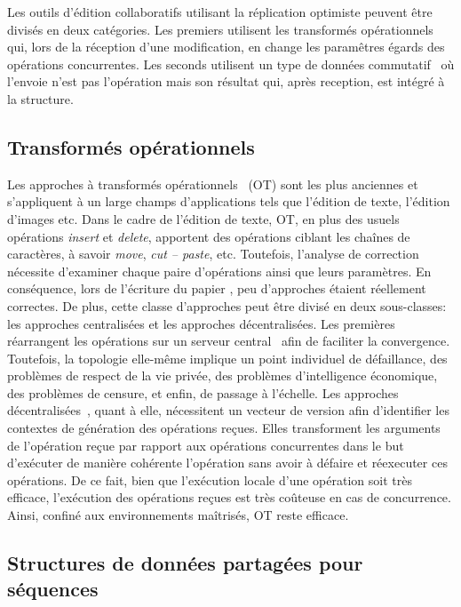 Les outils d'édition collaboratifs utilisant la réplication optimiste peuvent
être divisés en deux catégories. Les premiers utilisent les transformés
opérationnels~\cite{sun2009contextbased, sun1998operational} qui, lors de la
réception d'une modification, en change les paramêtres égards des opérations
concurrentes. Les seconds utilisent un type de données
commutatif~\cite{shapiro2011comprehensive, shapiro2011conflict} où l'envoie
n'est pas l'opération mais son résultat qui, après reception, est intégré à la
structure. 

\subsection{Transformés opérationnels}

Les approches à transformés opérationnels~\cite{sun2009contextbased,
  sun1998operational} (OT) sont les plus anciennes et s'appliquent à un large
champs d'applications tels que l'édition de texte, l'édition d'images etc. Dans
le cadre de l'édition de texte, OT, en plus des usuels opérations \emph{insert}
et \emph{delete}, apportent des opérations ciblant les chaînes de caractères, à
savoir \emph{move}, \emph{cut -- paste}, etc. Toutefois, l'analyse de correction
nécessite d'examiner chaque paire d'opérations ainsi que leurs paramètres. En
conséquence, lors de l'écriture du papier \cite{imine2003proving}, peu
d'approches étaient réellement correctes. De plus, cette classe d'approches peut
être divisé en deux sous-classes: les approches centralisées et les approches
décentralisées. Les premières réarrangent les opérations sur un serveur
central~\cite{nichols1995high} afin de faciliter la convergence. Toutefois, la
topologie elle-même implique un point individuel de défaillance, des problèmes
de respect de la vie privée, des problèmes d'intelligence économique, des
problèmes de censure, et enfin, de passage à l'échelle. Les approches
décentralisées~\cite{sun2009contextbased}, quant à elle, nécessitent un vecteur
de version afin d'identifier les contextes de génération des opérations
reçues. Elles transforment les arguments de l'opération reçue par rapport aux
opérations concurrentes dans le but d'exécuter de manière cohérente l'opération
sans avoir à défaire et réexecuter ces opérations. De ce fait, bien que
l'exécution locale d'une opération soit très efficace, l'exécution des
opérations reçues est très coûteuse en cas de concurrence. Ainsi, confiné aux
environnements maîtrisés, OT reste efficace.

\subsection{Structures de données partagées pour séquences}

